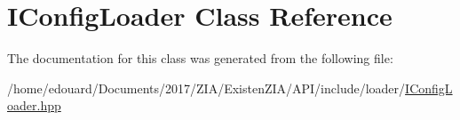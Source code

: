 \hypertarget{classIConfigLoader}{}\section{I\+Config\+Loader Class Reference}
\label{classIConfigLoader}


The documentation for this class was generated from the following file\+:\begin{DoxyCompactItemize}
\item 
/home/edouard/\+Documents/2017/\+Z\+I\+A/\+Existen\+Z\+I\+A/\+A\+P\+I/include/loader/\mbox{\hyperlink{IConfigLoader_8hpp}{I\+Config\+Loader.\+hpp}}\end{DoxyCompactItemize}
